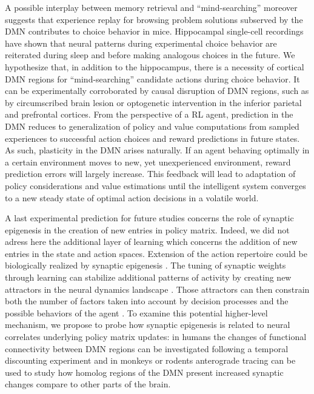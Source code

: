 \documentclass[10pt,letterpaper]{article}
\begin{document}
A possible interplay between memory retrieval and ``mind-searching'' moreover suggests that experience replay for browsing problem solutions subserved by the DMN contributes to choice behavior in mice. Hippocampal single-cell recordings have shown that neural patterns during experimental choice behavior are reiterated during sleep and before making analogous choices in the future. We hypothesize that, in addition to the hippocampus, there is a necessity of cortical DMN regions for ``mind-searching'' candidate actions during choice behavior. It can be experimentally corroborated by causal disruption of DMN regions, such as by circumscribed brain lesion or optogenetic intervention in the inferior parietal and prefrontal cortices.
From the perspective of a RL agent,
prediction in the DMN reduces to
generalization of
policy and value computations from sampled experiences to
successful action choices and reward predictions in future states.
As such,
plasticity in the DMN arises naturally.
If an agent behaving optimally in a certain environment moves
to new, yet unexperienced environment, reward prediction errors will
largely increase.
This feedback will lead to adaptation of policy considerations
and value estimations until the intelligent system converges to a
new steady state of optimal action decisions in a volatile world.


A last experimental prediction for future studies concerns the role of synaptic epigenesis in the creation of new entries in policy matrix. Indeed, we did not adress here the additional layer of learning which concerns the addition of new entries in the state and action spaces. Extension of the action repertoire could be biologically realized by synaptic epigenesis \citep{gisiger_acquisition_2005}. The tuning of synaptic weights through learning can stabilize additional patterns of activity by creating new attractors in the neural dynamics landscape \citep{takeuchi_synaptic_2014}. Those attractors can then constrain both the number of factors taken into account by decision processes and the possible behaviors of the agent \citep{wang_decision_2008}. To examine this potential higher-level mechanism, we propose to probe how synaptic epigenesis is related to neural correlates underlying policy matrix updates: in humans the changes of functional connectivity between DMN regions can be investigated following a temporal discounting experiment and in monkeys or rodents anterograde tracing can be used to study how homolog regions of the DMN present increased synaptic changes compare to other parts of the brain.
\end{document}
